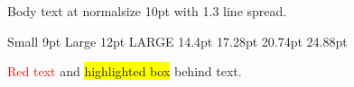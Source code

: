 \documentclass[10pt]{article}
\begin{document}
Body text at normalsize 10pt with 1.3 line spread.

{\small Small 9pt} {\large Large 12pt} {\Large LARGE 14.4pt} {\LARGE 17.28pt} {\huge 20.74pt} {\Huge 24.88pt}

\textcolor{red}{Red text} and \colorbox{yellow}{highlighted box} behind text.
\end{document}
